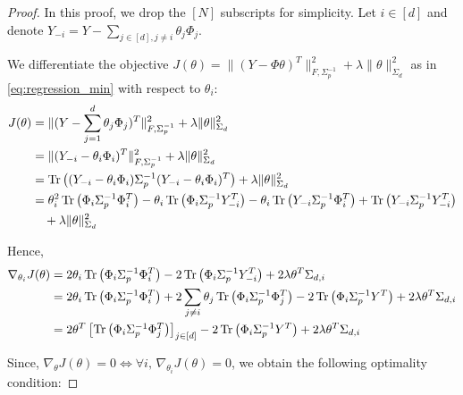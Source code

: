 \documentclass{article}
\begin{document}
\begin{proof}
In this proof, we drop the $[N]$ subscripts for simplicity.
Let $i\in[d]$ and denote $Y_{-i} = Y - \sum_{j\in[d], j\neq i} \theta_j\Phi_{j}$. 

We differentiate the objective $J(\theta) = \|(Y -\Phi\theta)^T\|_{F,\Sigma_p^{-1}}^2 + \lambda\|\theta\|_{\Sigma_d}^2$ as in  \eqref{eq:regression_min} with respect to $\theta_i$:
\begin{align*}
    J(\theta) &= \|(Y - \sum_{j=1}^d\theta_j\Phi_{j})^T\|_{F,\Sigma_p^{-1}}^2 + \lambda\|\theta\|_{\Sigma_d}^2\\
    &=  \|(Y_{-i} - \theta_i\Phi_{i})^T\|_{F,\Sigma_p^{-1}}^2 + \lambda\|\theta\|_{\Sigma_d}^2\\
    &= \operatorname{Tr}\left((Y_{-i} - \theta_i\Phi_{i})\Sigma_p^{-1}(Y_{-i} - \theta_i\Phi_{i})^T\right) + \lambda\|\theta\|_{\Sigma_d}^2\\
    &= \theta_i^2\operatorname{Tr}\left(\Phi_{i}\Sigma_p^{-1}\Phi_{i}^T\right) 
    -\theta_i\operatorname{Tr}\left(\Phi_{i}\Sigma_p^{-1}Y_{-i}^T\right) 
    -\theta_i\operatorname{Tr}\left(Y_{-i}\Sigma_p^{-1}\Phi_{i}^T\right)
    + \operatorname{Tr}\left(Y_{-i}\Sigma_p^{-1}Y_{-i}^T\right)
    \\
    &\quad+ \lambda\|\theta\|_{\Sigma_d}^2
\end{align*}

Hence, 
\begin{align*}
    \nabla_{\theta_i} J(\theta) &= 2\theta_i\operatorname{Tr}\left(\Phi_{i}\Sigma_p^{-1}\Phi_{i}^T\right)
    -2\operatorname{Tr}\left(\Phi_{i}\Sigma_p^{-1}Y_{-i}^T\right) 
    +2\lambda\theta^T\Sigma_{d,i}\\
    &= 2\theta_i\operatorname{Tr}\left(\Phi_{i}\Sigma_p^{-1}\Phi_{i}^T\right)
    +2\sum_{j\neq i}\theta_j\operatorname{Tr}\left(\Phi_{i}\Sigma_p^{-1}\Phi_j^T\right) 
    -2\operatorname{Tr}\left(\Phi_{i}\Sigma_p^{-1}Y^T\right) 
    +2\lambda\theta^T\Sigma_{d,i}\\
    &= 2\theta^T\begin{bmatrix}
    \operatorname{Tr}\left(\Phi_i \Sigma_p^{-1} \Phi_j^T\right)
    \end{bmatrix}_{j\in[d]}
    -2\operatorname{Tr}\left(\Phi_{i}\Sigma_p^{-1}Y^T\right) 
    +2\lambda\theta^T\Sigma_{d,i}\\
\end{align*}

Since, $\nabla_{\theta}J(\theta) = 0 \iff \forall i,\, \nabla_{\theta_i}J(\theta) = 0$, we obtain the following optimality condition:


\end{proof}
\end{document}
